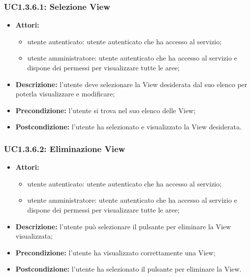 \subsubsection{UC1.3.6.1: Selezione View}

\begin{itemize}
 	\item \textbf{Attori:}
    \begin{itemize}
    	\item utente autenticato: utente autenticato che ha accesso al servizio;
    	\item utente amministratore: utente autenticato che ha accesso al servizio e dispone dei permessi per visualizzare tutte le aree;
	\end{itemize}
    \item \textbf{Descrizione:} l'utente deve selezionare la View\gloss{} desiderata dal suo elenco per poterla visualizzare e modificare;
    \item \textbf{Precondizione:} l'utente si trova nel suo elenco delle View\gloss{};
    \item \textbf{Postcondizione:} l'utente ha selezionato e visualizzato la View\gloss{} desiderata.
\end{itemize}

\subsubsection{UC1.3.6.2: Eliminazione View}

\begin{itemize}
   	\item \textbf{Attori:}
    \begin{itemize}
    	\item utente autenticato: utente autenticato che ha accesso al servizio;
    	\item utente amministratore: utente autenticato che ha accesso al servizio e dispone dei permessi per visualizzare tutte le aree;
	\end{itemize}
    \item \textbf{Descrizione:} l'utente può selezionare il pulsante per eliminare la View\gloss{} visualizzata;
    \item \textbf{Precondizione:} l'utente ha visualizzato correttamente una View\gloss{};
    \item \textbf{Postcondizione:} l'utente ha selezionato il pulsante per eliminare la View\gloss{}.
\end{itemize}

